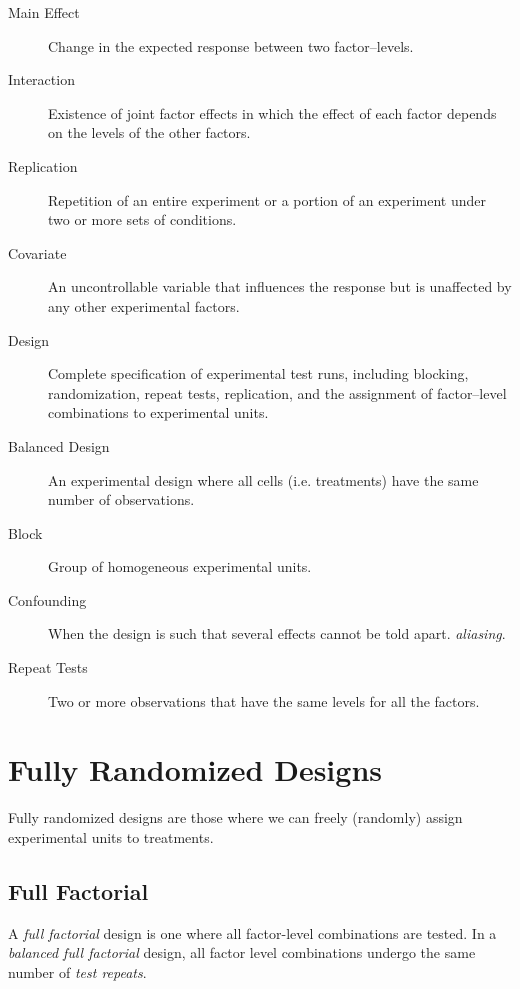 \begin{description}
\item [Main Effect] Change in the expected response between two factor–levels.  

\item [Interaction] Existence of joint factor effects in which the effect of each factor depends on the levels of the other factors.

\item [Replication] Repetition of an entire experiment or a portion of an experiment under two or more sets of conditions.

\item [Covariate]  An uncontrollable variable that influences the response but is
unaffected by any other experimental factors.

\item [Design]  Complete specification of experimental test runs, including blocking, randomization, repeat tests, replication, and the assignment of factor–level combinations to experimental units.

\item [Balanced Design] An experimental design where all cells (i.e. treatments) have the same number of observations.

\item [Block] Group of homogeneous experimental units.

\item [Confounding] When the design is such that several effects cannot be told apart. \Aka \emph{aliasing}.

\item [Repeat Tests] Two or more observations that have the same levels for all the factors.

\end{description}







\section{Fully Randomized Designs}
Fully randomized designs are those where we can freely (randomly) assign experimental units to treatments.


\subsection{Full Factorial}
A \emph{full factorial} design is one where all factor-level combinations are tested.
In a \emph{balanced full factorial} design, all factor level combinations undergo the same number of \emph{test repeats}.

